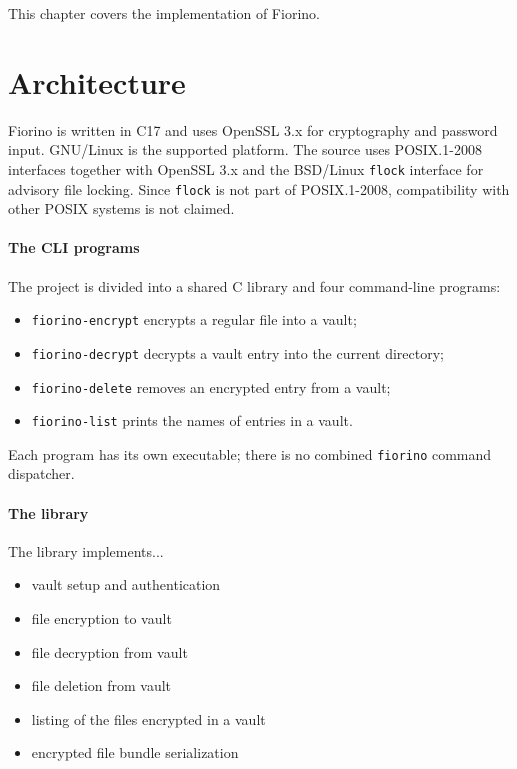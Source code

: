 This chapter covers the implementation of Fiorino.

\section{Architecture}

Fiorino is written in C17 and uses OpenSSL 3.x for cryptography and password
input. GNU/Linux is the supported platform. The source uses POSIX.1-2008
interfaces together with OpenSSL 3.x and the BSD/Linux \texttt{flock}
interface for advisory file locking. Since \texttt{flock} is not part of
POSIX.1-2008, compatibility with other POSIX systems is not claimed.

\paragraph{The CLI programs}
The project is divided into a shared C library and four command-line programs:

\begin{itemize}
    \item \texttt{fiorino-encrypt} encrypts a regular file into a vault;
    \item \texttt{fiorino-decrypt} decrypts a vault entry into the current directory;
    \item \texttt{fiorino-delete} removes an encrypted entry from a vault;
    \item \texttt{fiorino-list} prints the names of entries in a vault.
\end{itemize}

Each program has its own executable; there is no combined \texttt{fiorino} command dispatcher.

\paragraph{The library}
The library implements...

\begin{itemize}
    \item vault setup and authentication
    \item file encryption to vault
    \item file decryption from vault
    \item file deletion from vault
    \item listing of the files encrypted in a vault
    \item encrypted file bundle serialization
\end{itemize}

